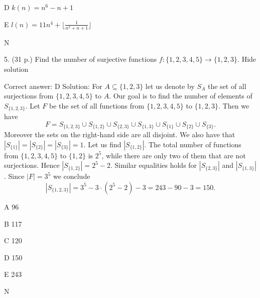    D    \( k(n)=n^6-n+1 \)

   E    \( l(n)=11n^4+\lfloor\frac1{n^2+n+1}\rfloor \)

   N
	

5.	(31 p.)
	Find the number of surjective functions \( f:\{1,2,3,4,5\}\to\{1,2,3\} \).
Hide solution

Correct answer: D
Solution: For \( A\subseteq \{1,2,3\} \) let us denote by \( S_A \) the set of all surjections from \( \{1,2,3,4,5\} \) to \( A \). Our goal is to find the number of elements of \( S_{\{1,2,3\}} \). Let \( F \) be the set of all functions from \( \{1,2,3,4,5\} \) to \( \{1,2,3\} \). Then we have \[ F=S_{\{1,2,3\}}\cup S_{\{1,2\}}\cup S_{\{2,3\}}\cup S_{\{1,3\}}\cup S_{\{1\}}\cup S_{\{2\}}\cup S_{\{3\}}.\] Moreover the sets on the right-hand side are all disjoint. We also have that \( |S_{\{1\}}|=|S_{\{2\}}|=|S_{\{3\}}|=1 \). Let us find \( |S_{\{1,2\}}| \). The total number of functions from \( \{1,2,3,4,5\} \) to \( \{1,2\} \) is \( 2^5 \), while there are only two of them that are not surjections. Hence \( |S_{\{1,2\}}|=2^5-2 \). Similar equalities holds for \( |S_{\{2,3\}}| \) and \( |S_{\{1,3\}}| \). Since \( |F|=3^5 \) we conclude \[ |S_{\{1,2,3\}}|= 3^5-3\cdot (2^5-2)-3=243-90-3=150.\]

   A    96

   B    117

   C    120

   D    150

   E    243

   N    